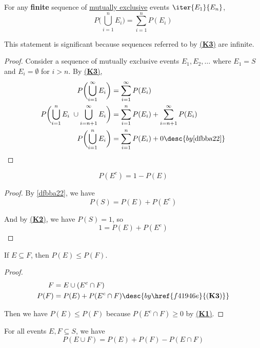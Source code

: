 For any \textbf{finite} sequence of \href{a16826f}{mutually exclusive} events
$\iter{E_1}{E_n}$,
$$
  P\biggl(\bigcup_{i=1}^nE_i\biggr)=\sum_{i=1}^nP(E_i)
$$

This statement is significant because sequences referred to by
\href{f41946e}{(\textbf{K3})} are infinite.

\begin{proof}
  Consider a sequence of mutually exclusive events $E_1,E_2,\ldots$ where
  $E_1=S$ and $E_i=\emptyset$ for $i>n$. By \href{f41946e}{(\textbf{K3})},
  \begin{align*}
    P\biggl(\bigcup_{i=1}^\infty E_i\biggr)                           &=\sum_{i=1}^\infty P(E_i)                        \\
    P\biggl(\bigcup_{i=1}^nE_i\ \cup\bigcup_{i=n+1}^\infty E_i\biggr) &=\sum_{i=1}^nP(E_i)+\sum_{i=n+1}^\infty P(E_i)   \\
    P\biggl(\bigcup_{i=1}^nE_i\biggr)                                 &=\sum_{i=1}^nP(E_i)+0\desc{by \autoref{dfbba22}}
  \end{align*}
\end{proof}

\label{e7dbe57}

$$
  P(E^c)=1-P(E)
$$

\begin{proof}
  By \autoref{dfbba22}, we have
  $$
    P(S)=P(E)+P(E^c)
  $$

  And by \href{f41946e}{(\textbf{K2})}, we have $P(S)=1$, so
  $$
    1=P(E)+P(E^c)
  $$
\end{proof}

\label{f21f09b}

If $E\subseteq F$, then $P(E)\leq P(F)$.

\begin{proof}
  \begin{align*}
    F    &=E\cup (E^c\cap F)                                        \\
    P(F) &=P(E)+P(E^c\cap F)\desc{by \href{f41946e}{(\textbf{K3})}}
  \end{align*}

  Then we have $P(E)\leq P(F)$ because $P(E^c\cap F)\geq0$ by
  \href{f41946e}{(\textbf{K1})}.
\end{proof}

\label{e1a8453}

For all events $E,F\subseteq S$, we have
$$
  P(E\cup F)=P(E)+P(F)-P(E\cap F)
$$

